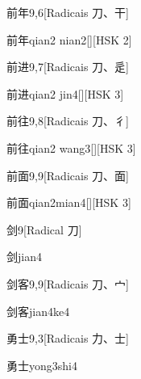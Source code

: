 \begin{entry}{前年}{9,6}[Radicais ⼑、⼲]
  \begin{phonetics}{前年}{qian2 nian2}[][HSK 2]
  \end{phonetics}
\end{entry}

\begin{entry}{前进}{9,7}[Radicais ⼑、⾡]
  \begin{phonetics}{前进}{qian2 jin4}[][HSK 3]
  \end{phonetics}
\end{entry}

\begin{entry}{前往}{9,8}[Radicais ⼑、⼻]
  \begin{phonetics}{前往}{qian2 wang3}[][HSK 3]
  \end{phonetics}
\end{entry}

\begin{entry}{前面}{9,9}[Radicais ⼑、⾯]
  \begin{phonetics}{前面}{qian2mian4}[][HSK 3]
  \end{phonetics}
\end{entry}

\begin{entry}{剑}{9}[Radical ⼑]
  \begin{phonetics}{剑}{jian4}
  \end{phonetics}
\end{entry}

\begin{entry}{剑客}{9,9}[Radicais ⼑、⼧]
  \begin{phonetics}{剑客}{jian4ke4}
  \end{phonetics}
\end{entry}

\begin{entry}{勇士}{9,3}[Radicais ⼒、⼠]
  \begin{phonetics}{勇士}{yong3shi4}
  \end{phonetics}
\end{entry}

